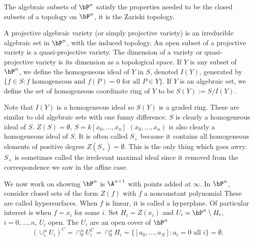The algebraic subsets of $\bP^n$ satisfy the properties needed to be the closed subsets of a topology on $\bP^n$, it is the Zariski topology. 


\begin{dfn}
A projective algebraic variety (or simply projective variety) is an irreducible algebraic set in $\bP^n$, with the induced topology. An open subset of a projective variety is a quasi-projective variety. The dimension of a variety or quasi-projective variety is its dimension as a topological space. If $Y$ is any subset of $\bP^n$, we define the homogeneous ideal of $Y$ in $S$, denoted $I(Y)$, generated by $\{ f \in S \colon f \text{ homogeneous and } f(P)=0 \text{ for all }P \in Y\}$. If $Y$ is an algebraic set, we define the set of homogeneous coordinate ring of $Y$ to be $S(Y):= S/I(Y)$.
\end{dfn}


Note that $I(Y)$ is a homogeneous ideal so $S(Y)$ is a graded ring. These are similar to old algebraic sets with one funny difference. $S$ is clearly a homogeneous ideal of $S$. $Z(S)= \emptyset$, $S= k[x_0,\ldots,x_n]$ $(x_0,\ldots,x_n)$ is also clearly a homogeneous ideal of $S$. It is often called $S_+$ because it contains all homogeneous elements of positive degree $Z(S_+)= \emptyset$. This is the only thing which goes awry. $S_+$ is sometimes called the irrelevant maximal ideal since it removed from the correspondence we saw in the affine case. 


We now work on showing $\bP^n$ is $\A^{n+1}$ with points added at $\infty$. In $\bP^n$, consider closed sets of the form $Z(f)$ with $f$ a nonconstant polynomial These are called hypersurfaces. When $f$ is linear, it is called a hyperplane. Of particular interest is when $f= x_i$ for some $i$. Set $H_i= Z(x_i)$ and $U_i= \bP^n \setminus H_i$, $i=0,\ldots,n$, $U_i$ open. The $U_i$ are an open cover of $\bP^n$
	\[
	(\cup_i^n U_i)^C= \cap_0^n U_i^C= \cap_0^n H_i= \{[a_0,\ldots,a_N] \colon a_i= 0 \text{ all }i\}= \emptyset. 
	\]


























